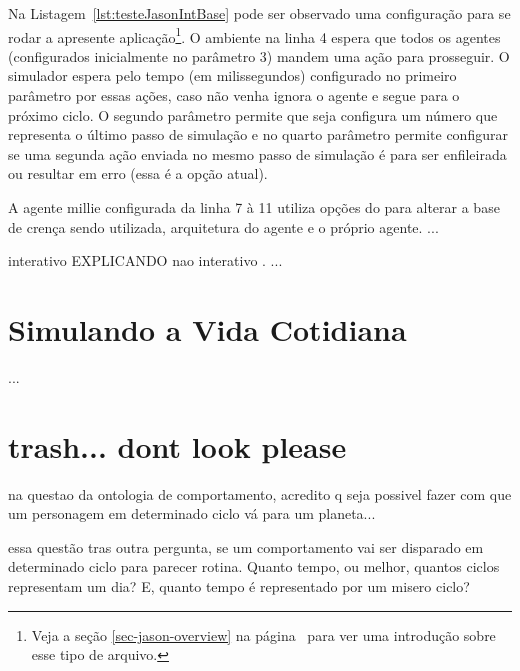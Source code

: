 Na Listagem~\ref{lst:testeJasonIntBase} pode ser observado uma configuração
para se rodar a apresente aplicação\footnote{Veja a seção
\ref{sec-jason-overview} na página~\pageref{sec-jason-overview}
para ver uma introdução sobre esse tipo de arquivo.}. O ambiente na linha 4
espera que todos os agentes (configurados inicialmente no parâmetro 3) mandem
uma ação para prosseguir. O simulador espera pelo tempo (em milissegundos)
configurado no primeiro parâmetro por essas ações, caso não venha ignora o
agente e segue para o próximo ciclo. O segundo parâmetro permite que seja
configura um número que representa o último passo de simulação e no quarto
parâmetro permite configurar se uma segunda ação enviada no mesmo passo de
simulação é para ser enfileirada ou resultar em erro (essa é a opção atual).

\begin{center}
    \begin{minipage}{130mm}
	\lstset{linewidth=130mm}
	
    \end{minipage}
\end{center}

A agente millie configurada da linha 7 à 11 utiliza opções do \jason para
alterar a base de crença sendo utilizada, arquitetura do agente e o próprio
agente. ...


interativo		EXPLICANDO
nao interativo	.
...

\section{Simulando a Vida Cotidiana} \label{ch:cdu:svc}

...



\section{trash... dont look please}
na questao da ontologia de comportamento, acredito q seja possivel
fazer com que um personagem em determinado ciclo vá para um
planeta...

essa questão tras outra pergunta, se um comportamento vai ser
disparado em determinado ciclo para parecer rotina. Quanto tempo,
ou melhor, quantos ciclos representam um dia? E, quanto tempo
é representado por um misero ciclo?

